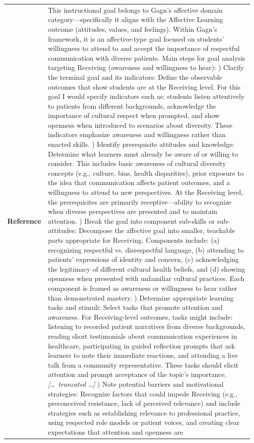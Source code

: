 \begin{longtable}{@{}l p{12.5cm}@{}}
  \textbf{Reference} & This instructional goal belongs to Gagn's affective domain category---specifically it aligns with the Affective Learning outcome (attitudes, values, and feelings). Within Gagn's framework, it is an affective-type goal focused on students' willingness to attend to and accept the importance of respectful communication with diverse patients. \newline Main steps for goal analysis targeting Receiving (awareness and willingness to hear): \newline 1) Clarify the terminal goal and its indicators: Define the observable outcomes that show students are at the Receiving level. For this goal I would specify indicators such as: students listen attentively to patients from different backgrounds, acknowledge the importance of cultural respect when prompted, and show openness when introduced to scenarios about diversity. These indicators emphasize awareness and willingness rather than enacted skills. \newline 2) Identify prerequisite attitudes and knowledge: Determine what learners must already be aware of or willing to consider. This includes basic awareness of cultural diversity concepts (e.g., culture, bias, health disparities), prior exposure to the idea that communication affects patient outcomes, and a willingness to attend to new perspectives. At the Receiving level, the prerequisites are primarily receptive---ability to recognize when diverse perspectives are presented and to maintain attention. \newline 3) Break the goal into component sub-skills or sub-attitudes: Decompose the affective goal into smaller, teachable parts appropriate for Receiving. Components include: (a) recognizing respectful vs. disrespectful language, (b) attending to patients' expressions of identity and concern, (c) acknowledging the legitimacy of different cultural health beliefs, and (d) showing openness when presented with unfamiliar cultural practices. Each component is framed as awareness or willingness to hear rather than demonstrated mastery. \newline 4) Determine appropriate learning tasks and stimuli: Select tasks that promote attention and awareness. For Receiving-level outcomes, tasks might include: listening to recorded patient narratives from diverse backgrounds, reading short testimonials about communication experiences in healthcare, participating in guided reflection prompts that ask learners to note their immediate reactions, and attending a live talk from a community representative. These tasks should elicit attention and prompt acceptance of the topic's importance. \newline \textit{[\ldots\ truncated \ldots]} \newline 7) Note potential barriers and motivational strategies: Recognize factors that could impede Receiving (e.g., preconceived resistance, lack of perceived relevance) and include strategies such as establishing relevance to professional practice, using respected role models or patient voices, and creating clear expectations that attention and openness are 
\end{longtable}
